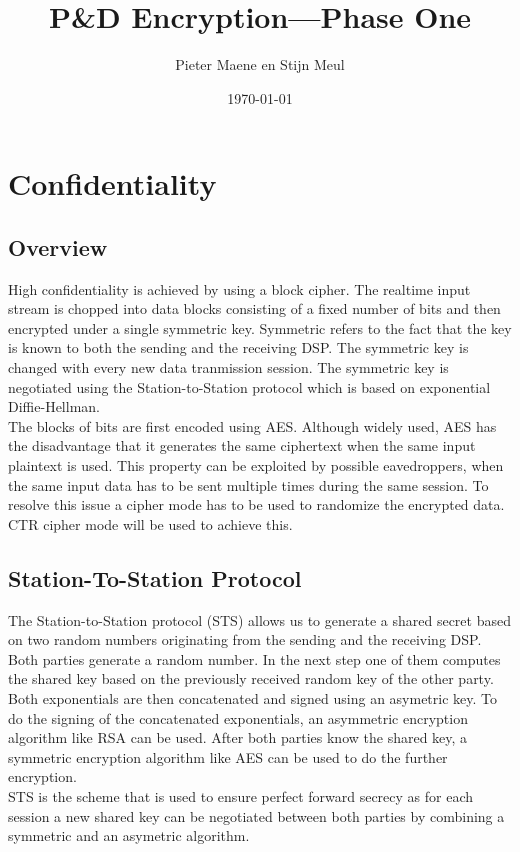 \documentclass[a4paper]{article}
\title{P\&D Encryption---Phase One}
\author{Pieter Maene en Stijn Meul}
\date{\today}
\begin{document}
\maketitle

\section{Confidentiality}

\subsection{Overview}
High confidentiality is achieved by using a block cipher. The realtime input stream is chopped into data blocks consisting of a fixed number of bits and then encrypted under a single symmetric key. Symmetric refers to the fact that the key is known to both the sending and the receiving DSP. The symmetric key is changed with every new data tranmission session. The symmetric key is negotiated using the Station-to-Station protocol which is based on exponential Diffie-Hellman.\\

The blocks of bits are first encoded using AES. Although widely used, AES has the disadvantage that it generates the same ciphertext when the same input plaintext is used. This property can be exploited by possible eavedroppers, when the same input data has to be sent multiple times during the same session. To resolve this issue a cipher mode has to be used to randomize the encrypted data. CTR cipher mode will be used to achieve this. 

\subsection{Station-To-Station Protocol}
The Station-to-Station protocol (STS) allows us to generate a shared secret based on two random numbers originating from the sending and the receiving DSP. Both parties generate a random number. In the next step one of them computes the shared key based on the previously received random key of the other party. Both exponentials are then concatenated and signed using an asymetric key. To do the signing of the concatenated exponentials, an asymmetric encryption algorithm like RSA can be used. After both parties know the shared key, a symmetric encryption algorithm like AES can be used to do the further encryption.\\

STS is the scheme that is used to ensure perfect forward secrecy as for each session a new shared key can be negotiated between both parties by combining a symmetric and an asymetric algorithm.
\end{document}
